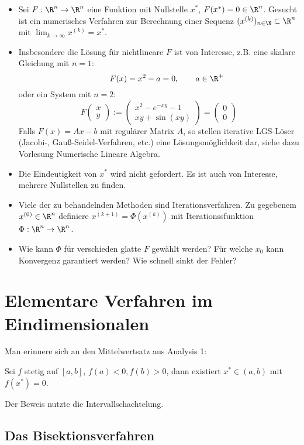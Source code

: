 \documentclass[11pt]{scrbook}
\begin{document}
\begin{itemize}
	\item
		Sei $F:\R^n \to \R^n$ eine Funktion mit Nullstelle $x^*$, $F(x^*) = 0 \in \R^n$.
		Gesucht ist ein numerisches Verfahren zur Berechnung einer Sequenz $(x^{(k)})_{n\in \N} \subset \R^n$ mit $\lim_{k\to \infty} x^{(k)} = x^*$.
	\item
		Insbesondere die Lösung für nichtlineare $F$ ist von Interesse, z.B. eine skalare Gleichung mit $n=1$:
		\[
			\qquad F(x) = x^2 - a = 0, \qquad a\in \R^+
		\]
		oder ein System mit $n=2$:
		\[
			F \begin{pmatrix}
				x \\ y
			\end{pmatrix}
			:= \begin{pmatrix}
				x^2 - e^{-xy} - 1 \\
				xy + \sin(xy)
			\end{pmatrix}
			= \begin{pmatrix}
				0 \\ 0
			\end{pmatrix}
		\]
		Falls $F(x) = Ax - b$ mit regulärer Matrix $A$, so stellen iterative LGS-Löser (Jacobi-, Gauß-Seidel-Verfahren, etc.) eine Lösungsmöglichkeit dar, siehe dazu Vorlesung Numerische Lineare Algebra.
	\item
		Die Eindeutigkeit von $x^*$ wird nicht gefordert. 
		Es ist auch von Interesse, mehrere Nullstellen zu finden.
	\item
		Viele der zu behandelnden Methoden sind Iterationsverfahren.
		Zu gegebenem $x^{(0)} \in \R^n$ definiere $x^{(k+1)} = \Phi(x^{(k)})$ mit Iterationssfunktion $\Phi : \R^n \to \R^n$.
	\item
		Wie kann $\Phi$ für verschieden glatte $F$ gewählt werden?
		Für welche $x_0$ kann Konvergenz garantiert werden?
		Wie schnell sinkt der Fehler?
\end{itemize}


\section{Elementare Verfahren im Eindimensionalen}


Man erinnere sich an den Mittelwertsatz aus Analysis 1:

Sei $f$ stetig auf $[a,b]$, $f(a) < 0, f(b) > 0$, dann existiert $x^* \in (a,b)$ mit $f(x^*)=0$.

Der Beweis nutzte die Intervallschachtelung.

\subsection{Das Bisektionsverfahren}
\end{document}
